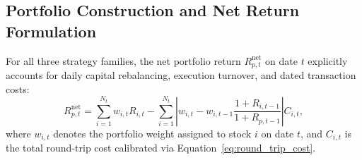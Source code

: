 \documentclass[11pt,a4paper]{article}
\begin{document}
\subsection{Portfolio Construction and Net Return Formulation}
For all three strategy families, the net portfolio return $R_{p,t}^{\text{net}}$ on date $t$ explicitly accounts for daily capital rebalancing, execution turnover, and dated transaction costs:
\begin{equation}
    R_{p,t}^{\text{net}} = \sum_{i=1}^{N_t} w_{i,t} R_{i,t} - \sum_{i=1}^{N_t} \left| w_{i,t} - w_{i,t-1} \frac{1 + R_{i,t-1}}{1 + R_{p,t-1}} \right| C_{i,t},
    \label{eq:net_portfolio_return}
\end{equation}
where $w_{i,t}$ denotes the portfolio weight assigned to stock $i$ on date $t$, and $C_{i,t}$ is the total round-trip cost calibrated via Equation~\eqref{eq:round_trip_cost}.
\end{document}

